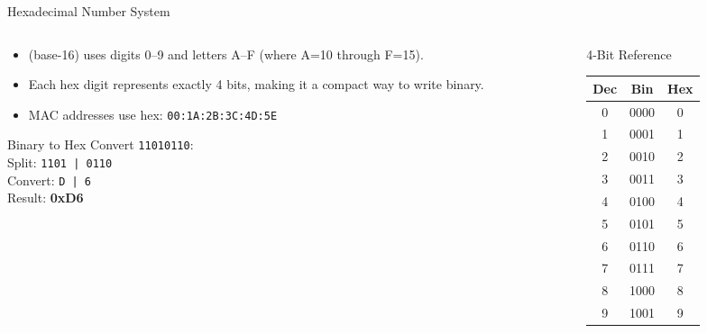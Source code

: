 \documentclass[aspectratio=169]{beamer}  %
\begin{document}
\begin{frame}{Hexadecimal Number System}
    \begin{columns}[T]
        \begin{column}{0.52\textwidth}
            \begin{itemize}
                \item {} (base-16) uses digits 0--9 and letters A--F (where A=10 through F=15).
                \item Each hex digit represents exactly 4 bits, making it a compact way to write binary.
                \item MAC addresses use hex: \texttt{00:1A:2B:3C:4D:5E}
            \end{itemize}
            
            \vspace{0.3em}
            \begin{exampleblock}{Binary to Hex}
                \small
                Convert \texttt{11010110}: \\
                Split: \texttt{1101 | 0110} \\
                Convert: \texttt{D | 6} \\
                Result: \textbf{0xD6}
            \end{exampleblock}
        \end{column}
        \begin{column}{0.44\textwidth}
            \begin{block}{4-Bit Reference}
                \centering
                \scriptsize
                \begin{tabular}{c c c}
                    \textbf{Dec} & \textbf{Bin} & \textbf{Hex} \\
                    \hline
                    0 & 0000 & 0 \\
                    1 & 0001 & 1 \\
                    2 & 0010 & 2 \\
                    3 & 0011 & 3 \\
                    4 & 0100 & 4 \\
                    5 & 0101 & 5 \\
                    6 & 0110 & 6 \\
                    7 & 0111 & 7 \\
                    8 & 1000 & 8 \\
                    9 & 1001 & 9 \\

\end{tabular}
\end{block}
\end{column}
\end{columns}
\end{frame}
\end{document}
